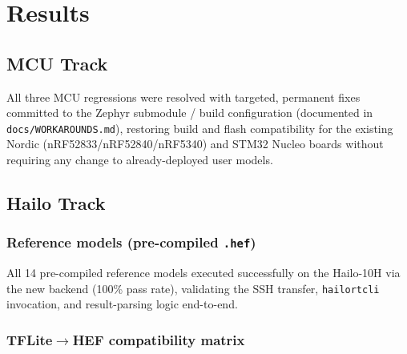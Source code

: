 \documentclass[11pt]{article}
\begin{document}
\section{Results}

\subsection{MCU Track}

All three MCU regressions were resolved with targeted, permanent fixes
committed to the Zephyr submodule / build configuration (documented in
\texttt{docs/WORKAROUNDS.md}), restoring build and flash compatibility for
the existing Nordic (nRF52833/nRF52840/nRF5340) and STM32 Nucleo boards
without requiring any change to already-deployed user models.

\subsection{Hailo Track}

\subsubsection{Reference models (pre-compiled \texttt{.hef})}

All 14 pre-compiled reference models executed successfully on the Hailo-10H
via the new backend (100\% pass rate), validating the SSH transfer,
\texttt{hailortcli} invocation, and result-parsing logic end-to-end.

\subsubsection{TFLite$\rightarrow$HEF compatibility matrix}
\end{document}
